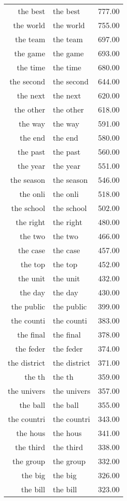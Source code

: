 \begin{table}[ht]
\begin{tabular}{rlr}
  the best & the best & 777.00 \\ 
  the world & the world & 755.00 \\ 
  the team & the team & 697.00 \\ 
  the game & the game & 693.00 \\ 
  the time & the time & 680.00 \\ 
  the second & the second & 644.00 \\ 
  the next & the next & 620.00 \\ 
  the other & the other & 618.00 \\ 
  the way & the way & 591.00 \\ 
  the end & the end & 580.00 \\ 
  the past & the past & 560.00 \\ 
  the year & the year & 551.00 \\ 
  the season & the season & 546.00 \\ 
  the onli & the onli & 518.00 \\ 
  the school & the school & 502.00 \\ 
  the right & the right & 480.00 \\ 
  the two & the two & 466.00 \\ 
  the case & the case & 457.00 \\ 
  the top & the top & 452.00 \\ 
  the unit & the unit & 432.00 \\ 
  the day & the day & 430.00 \\ 
  the public & the public & 399.00 \\ 
  the counti & the counti & 383.00 \\ 
  the final & the final & 378.00 \\ 
  the feder & the feder & 374.00 \\ 
  the district & the district & 371.00 \\ 
  the th & the th & 359.00 \\ 
  the univers & the univers & 357.00 \\ 
  the ball & the ball & 355.00 \\ 
  the countri & the countri & 343.00 \\ 
  the hous & the hous & 341.00 \\ 
  the third & the third & 338.00 \\ 
  the group & the group & 332.00 \\ 
  the big & the big & 326.00 \\ 
  the bill & the bill & 323.00 \\ 

\end{tabular}
\end{table}
